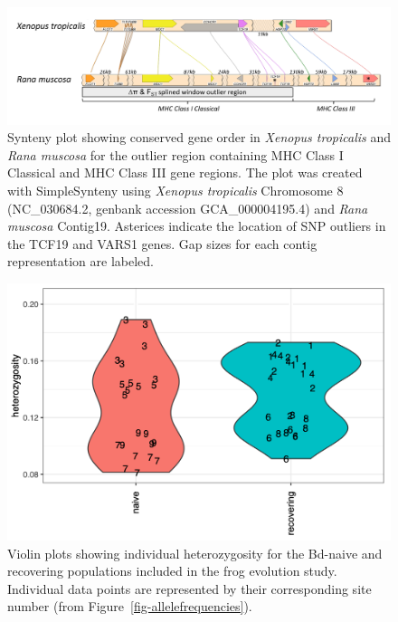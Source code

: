 \documentclass[
  letterpaper,
  DIV=11,
  numbers=noendperiod]{scrartcl}
\begin{document}
\begin{figure}

{\centering \includegraphics[width=6.77083in,height=\textheight]{figures/synteny_figure.png}

}

\caption{\label{fig-synteny-plot}Synteny plot showing conserved gene
order in \emph{Xenopus tropicalis} and \emph{Rana muscosa} for the
outlier region containing MHC Class I Classical and MHC Class III gene
regions. The plot was created with SimpleSynteny \citep{veltri2016}
using \emph{Xenopus tropicalis} Chromosome 8 (NC\_030684.2, genbank
accession GCA\_000004195.4) and \emph{Rana muscosa} Contig19. Asterices
indicate the location of SNP outliers in the TCF19 and VARS1 genes. Gap
sizes for each contig representation are labeled.}

\end{figure}

\newpage

\begin{figure}

{\centering \includegraphics[width=5.20833in,height=\textheight]{figures/violin_plot_heterozy_by_group.png}

}

\caption{\label{fig-violinplot-heterozy}Violin plots showing individual
heterozygosity for the Bd-naive and recovering populations included in
the frog evolution study. Individual data points are represented by
their corresponding site number (from
Figure~\ref{fig-allelefrequencies}).}

\end{figure}
\end{document}
